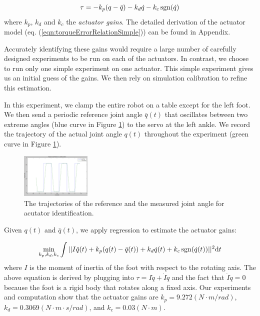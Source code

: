 \begin{equation}
  \tau = -k_p(q-\bar{q}) - k_d\dot{q} - k_c\operatorname{sgn}(\dot{q})\\
    \label{eqn:torqueErrorRelationSimple}
\end{equation}
where $k_p$, $k_d$ and $k_c$ the \emph{actuator gains}. The detailed derivation of the actuator model (eq. (\ref{eqn:torqueErrorRelationSimple})) can be found in Appendix.

Accurately identifying these gains would require a large number of carefully designed experiments to be run on each of the actuators. In contrast, we choose to run only one simple experiment on one actuator. This simple experiment gives us an initial guess of the gains. We then rely on simulation calibration to refine this estimation.

In this experiment, we clamp the entire robot on a table except for the left foot. We then send a periodic reference joint angle $\bar{q}(t)$ that oscillates between two extreme angles (blue curve in Figure \ref{fig:actuatorId}) to the servo at the left ankle. We record the trajectory of the actual joint angle $q(t)$ throughout the experiment (green curve in Figure \ref{fig:actuatorId}). 

\begin{figure}[!t]
  \centering
  \includegraphics[width=0.3\textwidth]{figures/actuatorId}
  \caption{The trajectories of the reference and the measured joint angle for acutator identification.}
  \vspace{-0.1in}
  \label{fig:actuatorId}
\end{figure}

Given $q(t)$ and $\bar{q}(t)$, we apply regression to estimate the actuator gains:

\begin{displaymath}
\min_{k_p, k_d, k_c}\int||I\ddot{q}(t)+k_p(q(t)-\bar{q}(t)) + k_d\dot{q}(t) + k_c\operatorname{sgn}(\dot{q}(t))||^2\mathrm{d}t
\end{displaymath}
where $I$ is the moment of inertia of the foot with respect to the rotating axis. The above equation is derived by plugging into $\tau = I\ddot{q}+\dot{I}\dot{q}$ and the fact that $\dot{I}\dot{q}=0$ because the foot is a rigid body that rotates along a fixed axis. Our experiments and computation show that the actuator gains are $k_p=9.272(N\cdot m/rad)$, $k_d=0.3069(N\cdot m\cdot s/rad)$, and $k_c=0.03(N\cdot m)$. 



